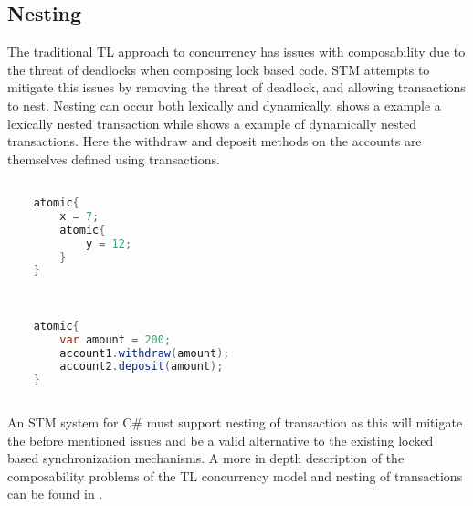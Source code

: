 \subsection{Nesting}
The traditional \ac{TL} approach to concurrency has issues with composability due to the threat of deadlocks\cite[p. 58]{sutter2005software} when composing lock based code. \ac{STM} attempts to mitigate this issues by removing the threat of deadlock, and allowing transactions to nest. Nesting can occur both lexically and dynamically\cite[p. 1]{kumar2011hparstm}\cite[p. 42]{harris2010transactional}\cite[p. 2081]{herlihy2011tm}.  shows a example a lexically nested transaction while  shows a example of dynamically nested transactions. Here the withdraw and deposit methods on the accounts are themselves defined using transactions.

\begin{lstlisting}[label=lst:stm_nested_transactions,
  caption={Lexically nested transactions},
  language=Java,  
  showspaces=false,
  showtabs=false,
  breaklines=true,
  showstringspaces=false,
  breakatwhitespace=true,
  commentstyle=\color{greencomments},
  keywordstyle=\color{bluekeywords},
  stringstyle=\color{redstrings},
  morekeywords={atomic, retry, orElse, var}]  % Start your code-block

	atomic{
		x = 7;
		atomic{
			y = 12;		
		}
	}
       
\end{lstlisting}

\begin{lstlisting}[label=lst:stm_nested_transactions_real,
  caption={Dynamically nested transactions},
  language=Java,  
  showspaces=false,
  showtabs=false,
  breaklines=true,
  showstringspaces=false,
  breakatwhitespace=true,
  commentstyle=\color{greencomments},
  keywordstyle=\color{bluekeywords},
  stringstyle=\color{redstrings},
  morekeywords={atomic, retry, orElse, var}]  % Start your code-block

	atomic{
		var amount = 200;
		account1.withdraw(amount);
		account2.deposit(amount);
	}
       
\end{lstlisting}

An \ac{STM} system for C\# must support nesting of transaction as this will mitigate the before mentioned issues and be a valid alternative to the existing locked based synchronization mechanisms. A more in depth description of the composability problems of the \ac{TL} concurrency model and nesting of transactions can be found in \cite{dpt907e14trending}.


